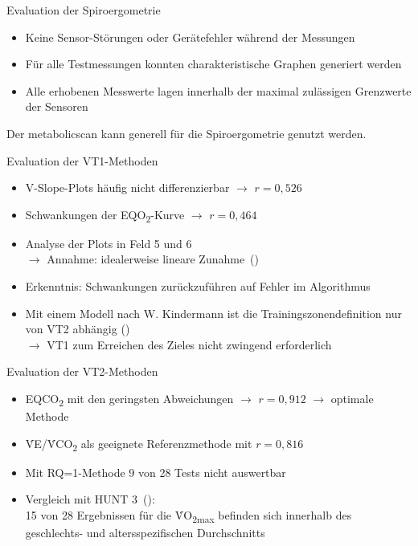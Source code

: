 \documentclass[colorBG,slideColor,8pt]{beamer}
\newcommand{\eqotwo}{EQO\textsubscript{2}}
\newcommand{\eqcotwo}{EQCO\textsubscript{2}}
\newcommand{\votwo}{\.{V}O\textsubscript{2}}
\newcommand{\vcotwo}{\.{V}CO\textsubscript{2}}
\newcommand{\ve}{\.{V}E}
\begin{document}
\begin{frame}{Evaluation der Spiroergometrie}
\begin{itemize}
	\item Keine Sensor-Störungen oder Gerätefehler während der Messungen
	\item Für alle Testmessungen konnten charakteristische Graphen generiert werden
	\item Alle erhobenen Messwerte lagen innerhalb der maximal zulässigen Grenzwerte der Sensoren
\end{itemize}
\vspace{4ex}
\begin{center}
	Der metabolicscan kann generell für die Spiroergometrie genutzt werden.
\end{center}
\end{frame}

\begin{frame}{Evaluation der VT1-Methoden}
\begin{itemize}
	\item V-Slope-Plots häufig nicht differenzierbar $\rightarrow$ $r = 0,526$
	\item Schwankungen der \eqotwo-Kurve $\rightarrow$ $r = 0,464$
	\item Analyse der Plots in Feld 5 und 6\\$\rightarrow$ Annahme: idealerweise lineare Zunahme~(\cite{Ruehle.2012})
	\item Erkenntnis: Schwankungen zurückzuführen auf Fehler im Algorithmus
	\item Mit einem Modell nach W. Kindermann ist die Trainingszonendefinition nur von VT2 abhängig (\cite{Kindermann.2004})\\$\rightarrow$ VT1 zum Erreichen des Zieles nicht zwingend erforderlich
\end{itemize}
\end{frame}

\begin{frame}{Evaluation der VT2-Methoden}
\begin{itemize}
	\item \eqcotwo{} mit den geringsten Abweichungen $\rightarrow$ $r = 0,912$ $\rightarrow$ optimale Methode
	\item \ve/\vcotwo{} als geeignete Referenzmethode mit $r = 0,816$
	\item Mit RQ=1-Methode 9 von 28 Tests nicht auswertbar
	\item Vergleich mit HUNT 3~(\cite{Loe.2014}):\\15 von 28 Ergebnissen für die \votwo\textsubscript{max} befinden sich innerhalb des geschlechts- und altersspezifischen Durchschnitts
\end{itemize}
\end{frame}
\end{document}
